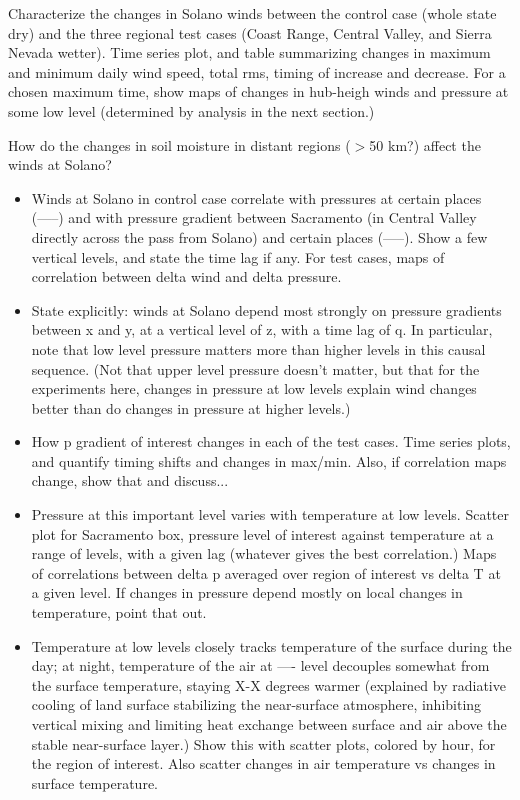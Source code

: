 \documentclass[12pt]{amsart}
\begin{document}
Characterize the changes in Solano winds between the control case (whole state dry) and the three regional test cases (Coast Range, Central Valley, and Sierra Nevada wetter).  Time series plot, and table summarizing changes in maximum and minimum daily wind speed, total rms, timing of increase and decrease.  For a chosen maximum time, show maps of changes in hub-heigh winds and pressure at some low level (determined by analysis in the next section.)

How do the changes in soil moisture in distant regions ($>$50 km?) affect the winds at Solano?
\begin{itemize}
\item Winds at Solano in control case correlate with pressures at certain places (-----) and with pressure gradient between Sacramento (in Central Valley directly across the pass from Solano) and certain places (-----).  Show a few vertical levels, and state the time lag if any.  For test cases, maps of correlation between delta wind and delta pressure.
\item State explicitly: winds at Solano depend most strongly on pressure gradients between x and y, at a vertical level of z, with a time lag of q.  In particular, note that low level pressure matters more than higher levels in this causal sequence. (Not that upper level pressure doesn't matter, but that for the experiments here, changes in pressure at low levels explain wind changes better than do changes in pressure at higher levels.)
\item How p gradient of interest changes in each of the test cases.  Time series plots, and quantify timing shifts and changes in max/min.  Also, if correlation maps change, show that and discuss... 
\item Pressure at this important level varies with temperature at low levels.  Scatter plot for Sacramento box, pressure level of interest against temperature at a range of levels, with a given lag (whatever gives the best correlation.)  Maps of correlations between delta p averaged over region of interest vs delta T at a given level.  If changes in pressure depend mostly on local changes in temperature, point that out.
\item Temperature at low levels closely tracks temperature of the surface during the day; at night, temperature of the air at ---- level decouples somewhat from the surface temperature, staying X-X degrees warmer (explained by radiative cooling of land surface stabilizing the near-surface atmosphere, inhibiting vertical mixing and limiting heat exchange between surface and air above the stable near-surface layer.)  Show this with scatter plots, colored by hour, for the region of interest.  Also scatter changes in air temperature vs changes in surface temperature.

\end{itemize}
\end{document}
